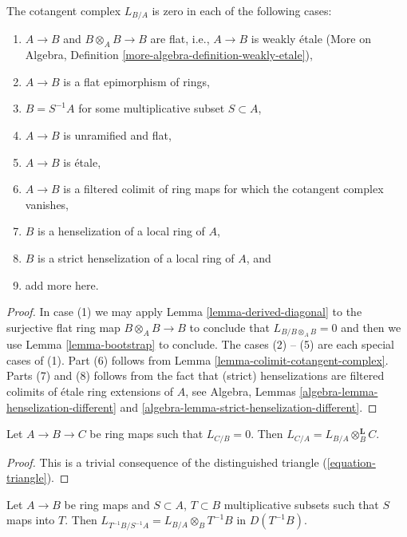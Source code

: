 \begin{lemma}
\label{lemma-when-zero}
The cotangent complex $L_{B/A}$ is zero in each of the following cases:
\begin{enumerate}
\item $A \to B$ and $B \otimes_A B \to B$ are flat, i.e., $A \to B$
is weakly \'etale
(More on Algebra, Definition \ref{more-algebra-definition-weakly-etale}),
\item $A \to B$ is a flat epimorphism of rings,
\item $B = S^{-1}A$ for some multiplicative subset $S \subset A$,
\item $A \to B$ is unramified and flat,
\item $A \to B$ is \'etale,
\item $A \to B$ is a filtered colimit of ring maps for which
the cotangent complex vanishes,
\item $B$ is a henselization of a local ring of $A$,
\item $B$ is a strict henselization of a local ring of $A$, and
\item add more here.
\end{enumerate}
\end{lemma}

\begin{proof}
In case (1) we may apply
Lemma \ref{lemma-derived-diagonal}
to the surjective flat ring map $B \otimes_A B \to B$
to conclude that $L_{B/B \otimes_A B} = 0$ and then we use
Lemma \ref{lemma-bootstrap}
to conclude. The cases (2) -- (5) are each special cases of (1).
Part (6) follows from Lemma \ref{lemma-colimit-cotangent-complex}.
Parts (7) and (8) follows from the fact that (strict) henselizations
are filtered colimits of \'etale ring extensions of $A$, see
Algebra, Lemmas \ref{algebra-lemma-henselization-different} and
\ref{algebra-lemma-strict-henselization-different}.
\end{proof}

\begin{lemma}
\label{lemma-localize-on-top}
Let $A \to B \to C$ be ring maps such that $L_{C/B} = 0$.
Then $L_{C/A} = L_{B/A} \otimes_B^\mathbf{L} C$.
\end{lemma}

\begin{proof}
This is a trivial consequence of 
the distinguished triangle (\ref{equation-triangle}).
\end{proof}

\begin{lemma}
\label{lemma-localize}
Let $A \to B$ be ring maps and $S \subset A$, $T \subset B$ multiplicative
subsets such that $S$ maps into $T$.
Then $L_{T^{-1}B/S^{-1}A} = L_{B/A} \otimes_B T^{-1}B$
in $D(T^{-1}B)$.
\end{lemma}

